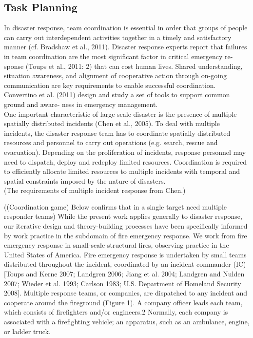\subsection{Task Planning}
In disaster response, team coordination is essential in order that groups of people can carry out interdependent activities together in a timely and satisfactory manner (cf. Bradshaw et al., 2011). Disaster response experts report that failures in team coordination are the most significant factor in critical emergency re- sponse (Toups et al., 2011: 2) that can cost human lives. Shared understanding, situation awareness, and alignment of cooperative action through on-going communication are key requirements to enable successful coordination. Convertino et al. (2011) design and study a set of tools to support common ground and aware- ness in emergency management. \\

 One important characteristic of large-scale disaster is the presence of multiple spatially distributed incidents (Chen et al., 2005). To deal with multiple incidents, the disaster response team has to coordinate spatially distributed resources and personnel to carry out operations (e.g. search, rescue and evacuation). Depending on the proliferation of incidents, response personnel may need to dispatch, deploy and redeploy limited resources. Coordination is required to efficiently allocate limited resources to multiple incidents with temporal and spatial constraints imposed by the nature of disasters.\\

(The requirements of multiple incident response from Chen.)


((Coordination game) Below confirms that in a single target need multiple responder teams)
While the present work applies generally to disaster response, our iterative design and theory-building processes have been specifically informed by work practice in the subdomain of fire emergency response. We work from fire emergency response in small-scale structural fires, observing practice in the United States of America. Fire emergency response is undertaken by small teams distributed throughout the incident, coordinated by an incident commander (IC) [Toups and Kerne 2007; Landgren 2006; Jiang et al. 2004; Landgren and Nulden 2007; Wieder et al. 1993; Carlson 1983; U.S. Department of Homeland Security 2008]. Multiple response teams, or companies, are dispatched to any incident and cooperate around the fireground (Figure 1). A company officer leads each team, which consists of firefighters and/or engineers.2 Normally, each company is associated with a firefighting vehicle; an apparatus, such as an ambulance, engine, or ladder truck.\\

